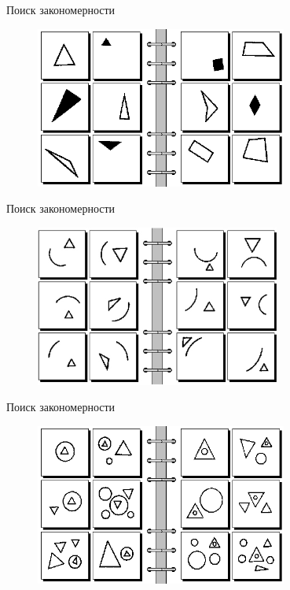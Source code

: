 \documentclass[10pt]{beamer}
\begin{document}
\begin{frame}{Поиск закономерности}
	\begin{figure}[htbp]
	  \includegraphics[height=150pt, keepaspectratio = true]{images/bongard6}   
	\end{figure}
\end{frame}

\begin{frame}{Поиск закономерности}
	\begin{figure}[htbp]
	  \includegraphics[height=150pt, keepaspectratio = true]{images/bongard40}   
	\end{figure}
\end{frame}

\begin{frame}{Поиск закономерности}
	\begin{figure}[htbp]
	  \includegraphics[height=150pt, keepaspectratio = true]{images/bongard47}   
	\end{figure}
\end{frame}
\end{document}
